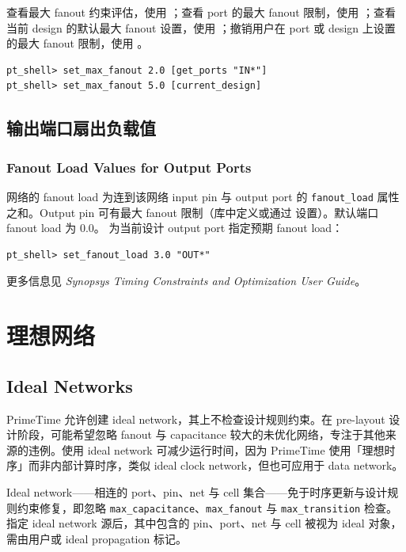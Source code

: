 查看最大 fanout 约束评估，使用 ；查看 port 的最大 fanout 限制，使用 ；查看当前 design 的默认最大 fanout 设置，使用 ；撤销用户在 port 或 design 上设置的最大 fanout 限制，使用 。

\begin{lstlisting}
pt_shell> set_max_fanout 2.0 [get_ports "IN*"]
pt_shell> set_max_fanout 5.0 [current_design]
\end{lstlisting}

\subsection{输出端口扇出负载值}
\subsubsection*{Fanout Load Values for Output Ports}

网络的 fanout load 为连到该网络 input pin 与 output port 的 \texttt{fanout\_load} 属性之和。Output pin 可有最大 fanout 限制（库中定义或通过  设置）。默认端口 fanout load 为 0.0。 为当前设计 output port 指定预期 fanout load：
\begin{lstlisting}
pt_shell> set_fanout_load 3.0 "OUT*"
\end{lstlisting}

\begin{seeAlsoBox}
更多信息见 \textit{Synopsys Timing Constraints and Optimization User Guide}。
\end{seeAlsoBox}


\section{理想网络}
\subsection*{Ideal Networks}

PrimeTime 允许创建 ideal network，其上不检查设计规则约束。在 pre-layout 设计阶段，可能希望忽略 fanout 与 capacitance 较大的未优化网络，专注于其他来源的违例。使用 ideal network 可减少运行时间，因为 PrimeTime 使用「理想时序」而非内部计算时序，类似 ideal clock network，但也可应用于 data network。

Ideal network——相连的 port、pin、net 与 cell 集合——免于时序更新与设计规则约束修复，即忽略 \texttt{max\_capacitance}、\texttt{max\_fanout} 与 \texttt{max\_transition} 检查。指定 ideal network 源后，其中包含的 pin、port、net 与 cell 被视为 ideal 对象，需由用户或 ideal propagation 标记。

